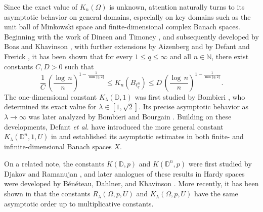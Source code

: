 \documentclass[a4paper,11pt, reqno]{amsart}
\theoremstyle{definition}
\newcounter {own}
\begin{document}
	Since the exact value of $K_{n}(\Omega)$ is unknown, attention naturally turns to its asymptotic behavior on general domains, especially on key domains such as the unit ball of Minkowski space and finite-dimensional complex Banach spaces. Beginning with the work of Dineen and Timoney \cite{Dineen-Timoney-1989}, and subsequently developed by Boas and Khavinson \cite{boas-1997,boas-2000}, with further extensions by Aizenberg \cite{aizn-2000a} and by Defant and Frerick \cite{defant-2011-lpn}, it has been shown that for every $1\leq q \leq \infty$ and all $n\in \mathbb{N}$, there exist constants $C,D>0$ such that 
	\begin{equation*}
		\frac{1}{C}\, \left(\frac{\log\,n}{n}\right)^{1-\frac{1}{\min\{q,2\}}} \leq K_{n}(B_{\ell^n _q}) \leq D \,\left(\frac{\log\,n}{n}\right)^{1-\frac{1}{\min\{q,2\}}}.
	\end{equation*}
	The one-dimensional constant $K_{\lambda}(\mathbb{D}, 1)$ was first studied by Bombieri \cite{bombieri-1962}, who determined its exact value for $\lambda \in [1,\sqrt{2}]$. Its precise asymptotic behavior as $\lambda\rightarrow \infty$ was later analyzed by Bombieri and Bourgain \cite{bombieri-2004}. Building on these developments, Defant {\it et al.} have introduced the more general constant $K_\lambda(\mathbb{D}^n,1,U)$ in \cite{defant-2012} and established its asymptotic estimates in both finite- and infinite-dimensional Banach spaces $X$. 
	\par
	On a related note, the constants $K(\mathbb{D},p)$ and $K(\mathbb{D}^n,p)$ were first studied by Djakov and Ramanujan \cite{Djakov & Ramanujan & J. Anal & 2000}, and later analogues of these results in Hardy spaces were developed by B\'{e}n\'{e}teau, Dahlner, and Khavinson \cite{bene-2004}. More recently, it has been shown in \cite{Himadri-local-Banach-1} that the constants $R_{\lambda}(\Omega, p,U)$ and $K_{\lambda}(\Omega, p,U)$ have the same asymptotic order up to multiplicative constants.
	\vspace{1mm}
	
\end{document}

